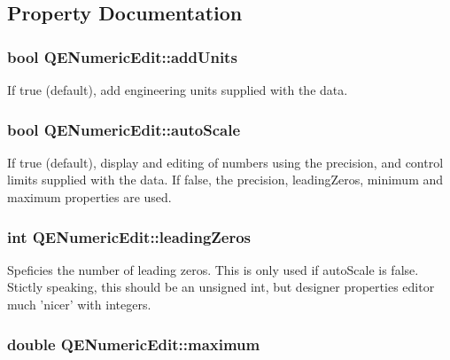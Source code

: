 \subsection{Property Documentation}
\hypertarget{classQENumericEdit_a826c1b66339d9a850523723e9a919c3f}{
\subsubsection[{addUnits}]{\setlength{\rightskip}{0pt plus 5cm}bool QENumericEdit::addUnits}}
\label{classQENumericEdit_a826c1b66339d9a850523723e9a919c3f}
If true (default), add engineering units supplied with the data. \hypertarget{classQENumericEdit_a9365903ab264ec3b9b52968741569203}{
\subsubsection[{autoScale}]{\setlength{\rightskip}{0pt plus 5cm}bool QENumericEdit::autoScale}}
\label{classQENumericEdit_a9365903ab264ec3b9b52968741569203}
If true (default), display and editing of numbers using the precision, and control limits supplied with the data. If false, the precision, leadingZeros, minimum and maximum properties are used. \hypertarget{classQENumericEdit_ab1c01d3e9bc7cc98b07ebdad3cd18053}{
\subsubsection[{leadingZeros}]{\setlength{\rightskip}{0pt plus 5cm}int QENumericEdit::leadingZeros}}
\label{classQENumericEdit_ab1c01d3e9bc7cc98b07ebdad3cd18053}
Speficies the number of leading zeros. This is only used if autoScale is false. Stictly speaking, this should be an unsigned int, but designer properties editor much 'nicer' with integers. \hypertarget{classQENumericEdit_a75a9a0d20f9a2065356cc6bf786a90af}{
\subsubsection[{maximum}]{\setlength{\rightskip}{0pt plus 5cm}double QENumericEdit::maximum}}
